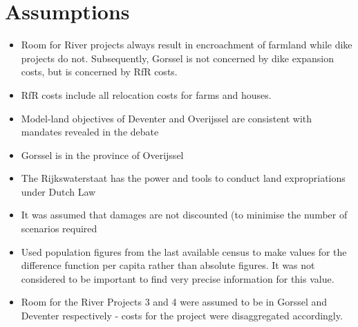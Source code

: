 
\section{Assumptions}
\begin{itemize}
    \item Room for River projects always result in encroachment of farmland while dike projects do not. Subsequently, Gorssel is not concerned by dike expansion costs, but is concerned by RfR costs.
    \item RfR costs include all relocation costs for farms and houses.
    \item Model-land objectives of Deventer and Overijssel are consistent with mandates revealed in the debate
    \item Gorssel is in the province of Overijssel
    \item The Rijkswaterstaat has the power and tools to conduct land expropriations under Dutch Law
    \item It was assumed that damages are not discounted (to minimise the number of scenarios required
    \item Used population figures from the last available census to make values for the difference function per capita rather than absolute figures. It was not considered to be important to find very precise information for this value.
    \item Room for the River Projects 3 and 4 were assumed to be in Gorssel and Deventer respectively - costs for the project were disaggregated accordingly.
\end{itemize}





